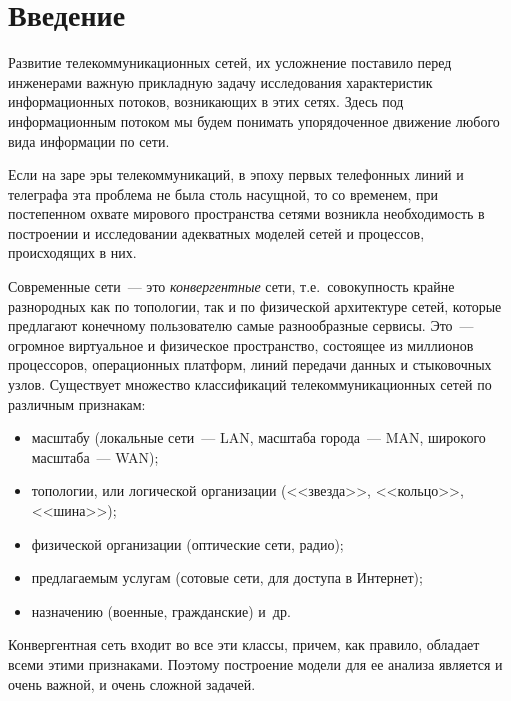 \begin{multicols}{2}


\label{st\stat}

\section{Введение}

Развитие телекоммуникационных сетей, их усложнение поставило перед
инженерами важную прикладную задачу исследования характеристик
информационных потоков, возникающих в этих сетях. Здесь под
информационным потоком мы будем понимать упорядоченное движение
любого вида информации по сети.

Если на заре эры телекоммуникаций, в эпоху первых телефонных линий и
телеграфа эта проблема не была столь насущной, то со временем, при
постепенном охвате мирового пространства сетями возникла необходимость в
построении и исследовании адекватных моделей сетей и процессов,
происходящих в них.

\thispagestyle{headings}


Современные сети~--- это \textit{конвергентные} сети, т.е.\ совокупность крайне
разнородных как по топологии, так и по физической архитектуре сетей, которые
предлагают конечному пользователю самые разнообразные сервисы. Это~--- огромное
виртуальное и физическое пространство, состоящее из миллионов процессоров,
операционных платформ, линий передачи данных и стыковочных узлов.
%
Существует множество классификаций телекоммуникационных сетей по различным
признакам:
\begin{itemize}
\item масштабу (локальные сети~--- LAN, масштаба города~---
MAN, широкого масштаба~--- WAN);
\item топологии, или логической организации (<<звезда>>,
<<кольцо>>, <<шина>>);
\item физической организации (оптические сети, радио);
\item предлагаемым услугам (сотовые сети, для доступа в
Интернет);
\item назначению (военные, гражданские) и~др.
\end{itemize}


Конвергентная сеть входит во все эти классы, причем, как правило,
обладает всеми этими признаками. Поэтому построение модели для ее анализа
является и очень важной, и очень сложной задачей.


\end{multicols}

